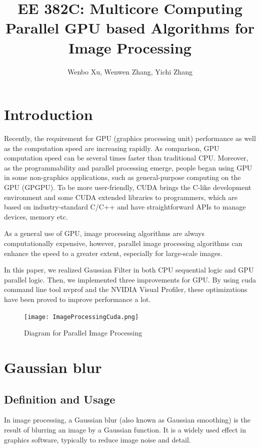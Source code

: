 \documentclass[journal,11pt,onecolumn,draftclsnofoot]{ieeeconf}  %
\author{Wenbo Xu, Wenwen Zhang, Yichi Zhang}
\title{
	EE 382C: Multicore Computing \protect\\
	\Large \bf Parallel GPU based Algorithms for Image Processing
}
\begin{document}
\maketitle
\thispagestyle{empty}
\pagestyle{empty}

\section{Introduction}
Recently, the requirement for GPU (graphics processing unit) performance as well as the computation speed are increasing rapidly. As comparison, GPU computation speed can be several times faster than traditional CPU. Moreover, as the programmability and parallel processing emerge\cite{1},  people began using GPU in some non-graphics applications, such as general-purpose computing on the GPU (GPGPU). To be more user-friendly, CUDA brings the C-like development environment and some CUDA extended libraries to programmers, which are based on industry-standard C/C++ and have straightforward APIs to manage devices, memory etc.

As a general use of GPU, image processing algorithms are always computationally expensive, however, parallel image processing algorithms can enhance the speed to a greater extent, especially for large-scale images.

In this paper, we realized Gaussian Filter in both CPU sequential logic and GPU parallel logic. Then, we implemented three improvements for GPU. By using cuda command line tool nvprof and the NVIDIA Visual Profiler, these optimizations have been proved to improve performance a lot.
\begin{figure}[h]

	\centering\texttt{[image: ImageProcessingCuda.png]}
	\caption{Diagram for Parallel Image Processing}
	\label{parallel}
	\vspace*{-10mm}	
	
\end{figure}


\section{Gaussian blur}
\subsection{Definition and Usage}
In image processing, a Gaussian blur (also known as Gaussian smoothing) is the result of blurring an image by a Gaussian function. It is a widely used effect in graphics software, typically to reduce image noise and  detail. 
\end{document}
